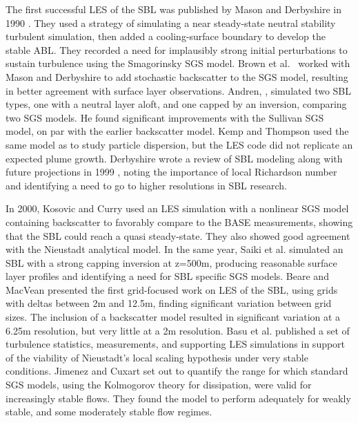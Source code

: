 \documentclass[conf]{new-aiaa}
\begin{document}
The first successful LES of the SBL was published by Mason and Derbyshire in 
1990 \cite{Mason1990}. They used a strategy of simulating a near steady-state 
neutral stability turbulent simulation, then added a cooling-surface boundary 
to develop the stable ABL. They recorded a need for implausibly strong initial 
perturbations to sustain turbulence using the Smagorinsky SGS model. Brown et 
al.\ \cite{Brown1994} worked with Mason and Derbyshire to add stochastic backscatter 
to the SGS model, resulting in better agreement with surface layer observations. 
Andren, \cite{Andren1995}, simulated two SBL types, one with a neutral layer aloft, and 
one capped by an inversion, comparing two SGS models. He found significant improvements 
with the Sullivan SGS model, on par with the earlier backscatter model. Kemp and 
Thompson \cite{Kemp1996} used the same model as \cite{Brown1994} to study particle 
dispersion, but the LES code did not replicate an expected plume growth. Derbyshire 
wrote a review of SBL modeling along with future projections in 1999 \cite{Derbyshire1999}, 
noting the importance of local Richardson number and identifying a need to go 
to higher resolutions in SBL research. 

In 2000, Kosovic and Curry \cite{Kosovic2000} used an LES simulation with a nonlinear SGS 
model containing backscatter to favorably compare to the BASE measurements, showing that 
the SBL could reach a quasi steady-state. They also showed good agreement with the Nieustadt 
analytical model. In the same year, Saiki et al. \cite{Saiki2000} simulated an SBL with 
a strong capping inversion at z=500m, producing reasonable surface layer profiles and 
identifying a need for SBL specific SGS models. Beare and MacVean \cite{Beare2004} 
presented the first grid-focused work on LES of the SBL, using grids with deltas 
between 2m and 12.5m, finding significant variation between grid sizes. The inclusion 
of a backscatter model resulted in significant variation at a 6.25m resolution, but 
very little at a 2m resolution. Basu et al. \cite{Basu2005} published a set of 
turbulence statistics, measurements, and supporting LES simulations in support 
of the viability of Nieustadt's local scaling hypothesis under very stable 
conditions. Jimenez and Cuxart \cite{Jimenez2005} set out to quantify the range 
for which standard SGS models, using the Kolmogorov theory for dissipation, were 
valid for increasingly stable flows. They found the model to perform adequately 
for weakly stable, and some moderately stable flow regimes. 
\end{document}

